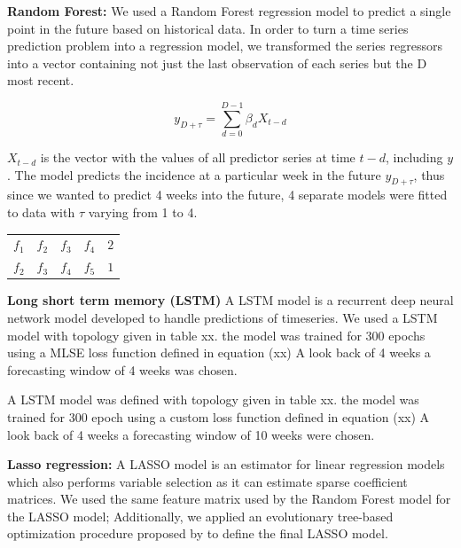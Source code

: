 \documentclass[12pt]{report}
\begin{document}
\begin{description}
 \item \textbf{Random Forest:}
 We used a Random Forest regression model to predict a single point in the future based on historical data. In order to turn a time series prediction problem into a regression model, we transformed the series regressors into a vector containing not just the last observation of each series but the {\cal D} most recent.
 
\begin{equation}
y_{D+\tau} = \sum_{d=0}^{D-1} \beta_d X_{t-d}
\end{equation}

$X_{t-d}$ is the vector with the values of all predictor series at time $t-d$, including $y$. The model predicts the incidence at a particular week in the future $y_{D+\tau}$, thus since we wanted to predict 4 weeks into the future, 4 separate models were fitted to data with $\tau$ varying from 1 to 4.


\begin{tabular}{cccc|c}
 $f_1$ & $f_2$ & $f_3$ & $f_4$ & $2$\\
 $f_2$  & $f_3$ & $f_4$ & $f_5$ & $1$\\
\end{tabular}


 
 \item \textbf{Long short term memory (LSTM)}
 A LSTM model is a recurrent deep neural network model developed to handle predictions of timeseries. We used a LSTM model with topology given in table xx. the model was trained for 300 epochs using a MLSE loss function defined in equation (xx) A look back 
of 4 weeks a forecasting window of 4 weeks was chosen.

 
 A LSTM model was defined with topology given in table xx. the model was trained 
for 300 epoch using a custom loss function defined in equation (xx) A look back 
of 4 weeks a forecasting window of 10 weeks were chosen.


 
 \item \textbf{Lasso regression:}
  A LASSO model is an estimator for linear regression models which also performs variable selection as it can estimate sparse coefficient matrices. We used the same feature matrix used by the Random Forest model for the LASSO model; Additionally, we applied an evolutionary tree-based optimization procedure proposed by \citet{Olson_Bartley_Urbanowicz_Moore_2016} to define the final LASSO model.
 
\end{description}
\end{document}
